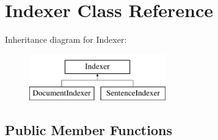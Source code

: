 \hypertarget{classIndexer}{\section{Indexer Class Reference}
\label{classIndexer}
}
Inheritance diagram for Indexer\-:\begin{figure}[H]
\begin{center}
\leavevmode
\includegraphics[height=2.000000cm]{classIndexer}
\end{center}
\end{figure}
\subsection*{Public Member Functions}
